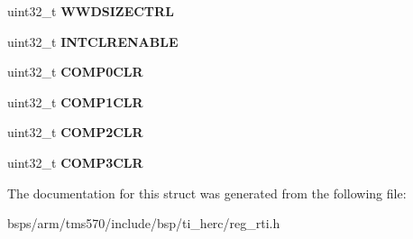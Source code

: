 \begin{DoxyCompactItemize}
uint32\+\_\+t {\bfseries W\+W\+D\+S\+I\+Z\+E\+C\+T\+RL}
\item 
\mbox{\label{structtms570__rti__t_a3308fdf52ef49840188419a3cf0f356d}} 
uint32\+\_\+t {\bfseries I\+N\+T\+C\+L\+R\+E\+N\+A\+B\+LE}
\item 
\mbox{\label{structtms570__rti__t_aafba5d895441ef3ba2434fcefc8b3940}} 
uint32\+\_\+t {\bfseries C\+O\+M\+P0\+C\+LR}
\item 
\mbox{\label{structtms570__rti__t_ae551d87537b045be1800441dda8feb5e}} 
uint32\+\_\+t {\bfseries C\+O\+M\+P1\+C\+LR}
\item 
\mbox{\label{structtms570__rti__t_a36ef6a6cdd54ea1db59739efa6d6e8ad}} 
uint32\+\_\+t {\bfseries C\+O\+M\+P2\+C\+LR}
\item 
\mbox{\label{structtms570__rti__t_a9260dab3b756a2b183ddb5a6fd2020bb}} 
uint32\+\_\+t {\bfseries C\+O\+M\+P3\+C\+LR}
\end{DoxyCompactItemize}


The documentation for this struct was generated from the following file\+:\begin{DoxyCompactItemize}
\item 
bsps/arm/tms570/include/bsp/ti\+\_\+herc/reg\+\_\+rti.\+h\end{DoxyCompactItemize}
